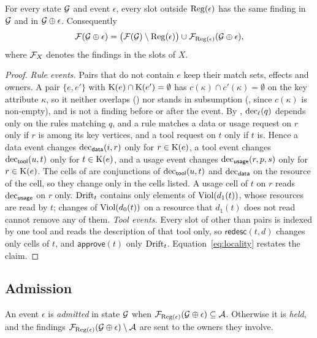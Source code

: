 \begin{theorem}[Locality]\label{thm:locality}
For every state $\mathcal{G}$ and event $\epsilon$, every slot outside $\mathrm{Reg}(\epsilon)$ has the same finding in $\mathcal{G}$ and in $\mathcal{G} \oplus \epsilon$. Consequently
\begin{equation}
\mathcal{F}(\mathcal{G} \oplus \epsilon) = \bigl(\mathcal{F}(\mathcal{G}) \setminus \mathrm{Reg}(\epsilon)\bigr) \cup \mathcal{F}_{\mathrm{Reg}(\epsilon)}(\mathcal{G} \oplus \epsilon), \label{eq:locality}
\end{equation}
where $\mathcal{F}_X$ denotes the findings in the slots of $X$.
\end{theorem}
\begin{proof}
\emph{Rule events.} Pairs that do not contain $e$ keep their match sets, effects and owners. A pair $\{e, e'\}$ with $\mathrm{K}(e) \cap \mathrm{K}(e') = \emptyset$ has $c(\kappa) \cap c'(\kappa) = \emptyset$ on the key attribute $\kappa$, so it neither overlaps () nor stands in subsumption (, since $c(\kappa)$ is non-empty), and is not a finding before or after the event. By , $\mathrm{dec}_\ell(q)$ depends only on the rules matching $q$, and a rule matches a data or usage request on $r$ only if $r$ is among its key vertices, and a tool request on $t$ only if $t$ is. Hence a data event changes $\mathrm{dec}_{\mathsf{data}}(i, r)$ only for $r \in \mathrm{K}(e)$, a tool event changes $\mathrm{dec}_{\mathsf{tool}}(u, t)$ only for $t \in \mathrm{K}(e)$, and a usage event changes $\mathrm{dec}_{\mathsf{usage}}(r, p, s)$ only for $r \in \mathrm{K}(e)$. The cells of  are conjunctions of $\mathrm{dec}_{\mathsf{tool}}(u, t)$ and $\mathrm{dec}_{\mathsf{data}}$ on the resource of the cell, so they change only in the cells listed. A usage cell of $t$ on $r$ reads $\mathrm{dec}_{\mathsf{usage}}$ on $r$ only. $\mathrm{Drift}_t$ contains only elements of $\mathrm{Viol}(d_1(t))$, whose resources are read by $t$; changes of $\mathrm{Viol}(d_0(t))$ on a resource that $d_1(t)$ does not read cannot remove any of them.
\emph{Tool events.} Every slot of  other than pairs is indexed by one tool and reads the description of that tool only, so $\mathsf{redesc}(t, d)$ changes only cells of $t$, and $\mathsf{approve}(t)$ only $\mathrm{Drift}_t$.
Equation~\eqref{eq:locality} restates the claim.
\end{proof}

\subsection{Admission}\label{sec:admit}
\begin{definition}\label{def:admission}
An event $\epsilon$ is \emph{admitted} in state $\mathcal{G}$ when $\mathcal{F}_{\mathrm{Reg}(\epsilon)}(\mathcal{G} \oplus \epsilon) \subseteq \mathcal{A}$. Otherwise it is \emph{held}, and the findings $\mathcal{F}_{\mathrm{Reg}(\epsilon)}(\mathcal{G} \oplus \epsilon) \setminus \mathcal{A}$ are sent to the owners they involve.
\end{definition}

